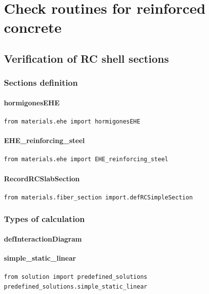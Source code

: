 \section{Check routines for reinforced concrete}
\subsection{Verification of RC shell sections}
\subsubsection{Sections definition}
\paragraph{hormigonesEHE}
\begin{verbatim}
from materials.ehe import hormigonesEHE
\end{verbatim}

\paragraph{EHE\_reinforcing\_steel}
\begin{verbatim}
from materials.ehe import EHE_reinforcing_steel
\end{verbatim}

\paragraph{RecordRCSlabSection}
\begin{verbatim}
from materials.fiber_section import.defRCSimpleSection
\end{verbatim}


\subsubsection{Types of calculation}
\paragraph{defInteractionDiagram}

\paragraph{simple\_static\_linear}
\begin{verbatim}
from solution import predefined_solutions
predefined_solutions.simple_static_linear
\end{verbatim}

